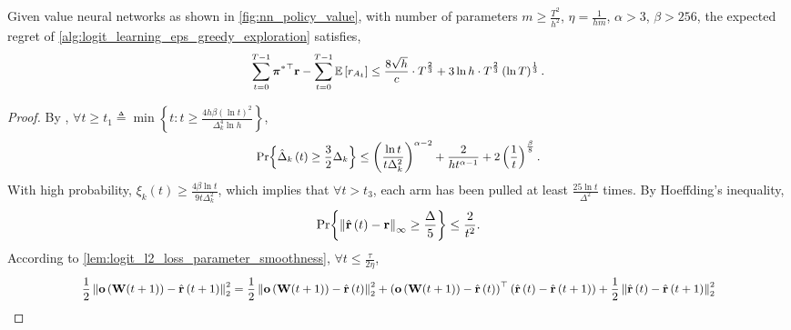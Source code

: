 \begin{thm}
\label{thm:logit_learning_main_result}
    Given value neural networks as shown in \cref{fig:nn_policy_value}, with number of parameters $m \ge \frac{T^2}{h^2}$, $\eta = \frac{1}{h m}$, $\alpha > 3$, $\beta > 256$, the expected regret of \cref{alg:logit_learning_eps_greedy_exploration} satisfies,
\begin{equation*}
\small
\begin{split}
    \sum\limits_{t=0}^{T-1}{ {\rvpi^*}^\top \rvr } - \sum\limits_{t=0}^{T-1}{ \sE \left[ r_{A_t} \right] } \le \frac{8 \sqrt{h}}{c} \cdot T^{\frac{2}{3}} + 3 \ln{h} \cdot T^{\frac{2}{3}} \left(\ln{T}\right)^{\frac{1}{3}}.
\end{split}
\end{equation*}
\end{thm}
\begin{proof}
    By \citep{seldin2017improved},
    $\forall t \ge t_1 \triangleq \min{\left\{ t : t \ge \frac{4 h \beta \left(\ln{t}\right)^2}{\Delta_k^4 \ln{h}} \right\}}$,
\begin{equation*}
\small
\begin{split}
    \pr{\left\{ \hat{\Delta}_k\left(t\right) \ge \frac{3}{2} \Delta_k \right\}} \le \left( \frac{\ln{t}}{t \Delta_k^2} \right)^{\alpha - 2} + \frac{2}{h t^{\alpha - 1}} + 2 \left(\frac{1}{t}\right)^{\frac{\beta}{8}}.
\end{split}
\end{equation*}
With high probability, $\xi_k\left(t\right) \ge \frac{4 \beta \ln{t}}{9 t \Delta_k^2}$, which implies that $\forall t > t_3$,  each arm has been pulled at least $\frac{25\ln{t}}{\Delta^2}$ times. By Hoeffding's inequality,
\begin{equation*}
\begin{split}
    {\text{Pr}}{\left\{ \left\| \hat{{\mathbf{r}}}\left(t\right) - {\mathbf{r}}\right\|_\infty \ge \frac{\Delta}{5} \right\}} \le \frac{2}{t^2}.
\end{split}
\end{equation*}
According to \cref{lem:logit_l2_loss_parameter_smoothness}, $\forall t \le \frac{\tau}{2 \eta}$,
\begin{equation*}
\small
\begin{split}
    \frac{1}{2} \left\| \rvo\left( \rmW(t+1) \right) - \hat{\rvr}\left(t+1\right)\right\|_2^2 &= \frac{1}{2} \left\| \rvo\left( \rmW(t+1) \right) - \hat{\rvr}\left(t\right)\right\|_2^2 + \left( \rvo\left( \rmW(t+1) \right) - \hat{\rvr}\left(t\right) \right)^\top \left( \hat{\rvr}\left(t\right) - \hat{\rvr}\left(t+1\right) \right) + \frac{1}{2} \left\| \hat{\rvr}\left(t\right) - \hat{\rvr}\left(t+1\right) \right\|_2^2 \\

\end{split}
\end{equation*}
\end{proof}
